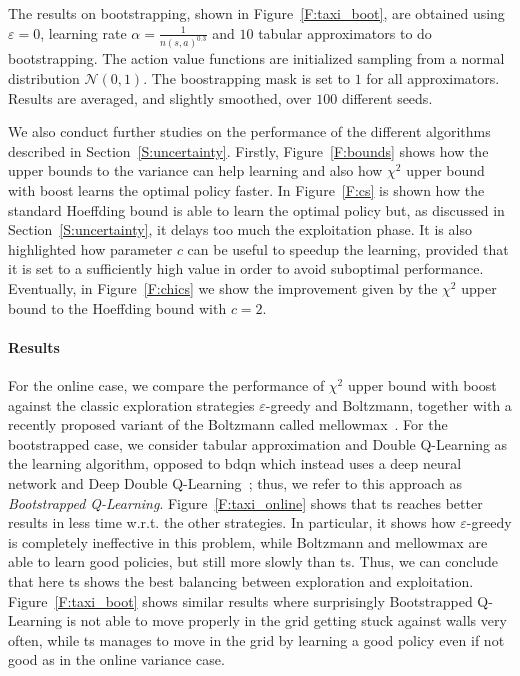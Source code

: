 The results on bootstrapping, shown in Figure~\ref{F:taxi_boot}, are obtained using $\varepsilon = 0$, learning rate $\alpha = \frac{1}{n(s,a)^{0.3}}$ and $10$ tabular approximators to do bootstrapping. The action value functions are initialized sampling from a normal distribution $\mathcal{N}(0, 1)$. The boostrapping mask is set to $1$ for all approximators. Results are averaged, and slightly smoothed, over $100$ different seeds.

We also conduct further studies on the performance of the different algorithms described in Section~\ref{S:uncertainty}. Firstly, Figure~\ref{F:bounds} shows how the upper bounds to the variance can help learning and also how $\chi^2$ upper bound with boost learns the optimal policy faster. In Figure~\ref{F:cs} is shown how the standard Hoeffding bound is able to learn the optimal policy but, as discussed in Section~\ref{S:uncertainty}, it delays too much the exploitation phase. It is also highlighted how parameter $c$ can be useful to speedup the learning, provided that it is set to a sufficiently high value in order to avoid suboptimal performance. Eventually, in Figure~\ref{F:chics} we show the improvement given by the $\chi^2$ upper bound to the Hoeffding bound with $c = 2$.
\paragraph{Results}For the online case, we compare the performance of $\chi^2$ upper bound with boost against the classic exploration strategies $\varepsilon$-greedy and Boltzmann, together with a recently proposed variant of the Boltzmann called mellowmax~\cite{pmlr-v70-asadi17a}. For the bootstrapped case, we consider tabular approximation and Double Q-Learning as the learning algorithm, opposed to \gls{bdqn}  which instead uses a deep neural network and Deep Double Q-Learning~\cite{van2016deep}; thus, we refer to this approach as \textit{Bootstrapped Q-Learning}. Figure~\ref{F:taxi_online} shows that \gls{ts} reaches better results in less time w.r.t. the other strategies. In particular, it shows how $\varepsilon$-greedy is completely ineffective in this problem, while Boltzmann and mellowmax are able to learn good policies, but still more slowly than \gls{ts}. Thus, we can conclude that here \gls{ts} shows the best balancing between exploration and exploitation. Figure~\ref{F:taxi_boot} shows similar results where surprisingly Bootstrapped Q-Learning is not able to move properly in the grid getting stuck against walls very often, while \gls{ts} manages to move in the grid by learning a good policy even if not good as in the online variance case.

